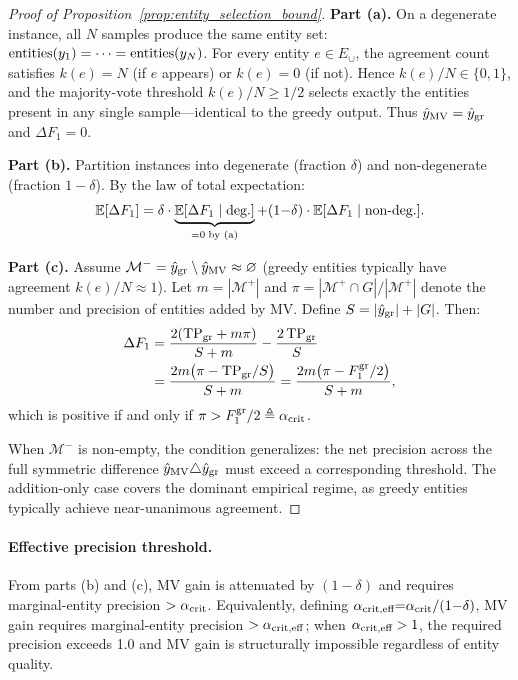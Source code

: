 \begin{proof}[Proof of Proposition~\ref{prop:entity_selection_bound}]
\textbf{Part (a).} On a degenerate instance, all $N$ samples produce the same entity set: $\textup{entities}(y_1) = \cdots = \textup{entities}(y_N)$. For every entity $e \in E_\cup$, the agreement count satisfies $k(e) = N$ (if $e$ appears) or $k(e) = 0$ (if not). Hence $k(e)/N \in \{0,1\}$, and the majority-vote threshold $k(e)/N \geq 1/2$ selects exactly the entities present in any single sample---identical to the greedy output. Thus $\hat{y}_{\textup{MV}} = \hat{y}_{\textup{gr}}$ and $\Delta F_1 = 0$.

\textbf{Part (b).} Partition instances into degenerate (fraction $\delta$) and non-degenerate (fraction $1{-}\delta$). By the law of total expectation:
\[
\mathbb{E}[\Delta F_1] = \delta \cdot \underbrace{\mathbb{E}[\Delta F_1 \mid \textup{deg.}]}_{= 0 \;\textup{by (a)}} + (1{-}\delta) \cdot \mathbb{E}[\Delta F_1 \mid \textup{non-deg.}].
\]

\textbf{Part (c).} Assume $\mathcal{M}^- = \hat{y}_{\textup{gr}} \setminus \hat{y}_{\textup{MV}} \approx \varnothing$ (greedy entities typically have agreement $k(e)/N \approx 1$). Let $m = |\mathcal{M}^+|$ and $\pi = |\mathcal{M}^+ \cap G|/|\mathcal{M}^+|$ denote the number and precision of entities added by MV. Define $S = |\hat{y}_{\textup{gr}}| + |G|$. Then:
\begin{align*}
\Delta F_1 &= \frac{2(\textup{TP}_{\textup{gr}} + m\pi)}{S + m} - \frac{2\,\textup{TP}_{\textup{gr}}}{S} \\
&= \frac{2m\bigl(\pi - \textup{TP}_{\textup{gr}}/S\bigr)}{S + m}
= \frac{2m\bigl(\pi - F_1^{\textup{gr}}/2\bigr)}{S + m},
\end{align*}
which is positive if and only if $\pi > F_1^{\textup{gr}}/2 \triangleq \alpha_{\textup{crit}}$.

When $\mathcal{M}^-$ is non-empty, the condition generalizes: the net precision across the full symmetric difference $\hat{y}_{\textup{MV}} \triangle \hat{y}_{\textup{gr}}$ must exceed a corresponding threshold. The addition-only case covers the dominant empirical regime, as greedy entities typically achieve near-unanimous agreement.
\end{proof}

\paragraph{Effective precision threshold.}
From parts (b) and (c), MV gain is attenuated by $(1{-}\delta)$ and requires marginal-entity precision $> \alpha_{\textup{crit}}$.
Equivalently, defining $\alpha_{\textup{crit,eff}} {=} \alpha_{\textup{crit}} / (1{-}\delta)$, MV gain requires marginal-entity precision $> \alpha_{\textup{crit,eff}}$; when $\alpha_{\textup{crit,eff}} > 1$, the required precision exceeds 1.0 and MV gain is structurally impossible regardless of entity quality.

